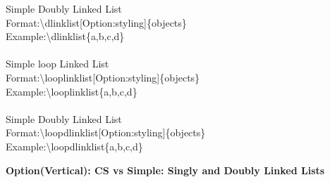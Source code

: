 \documentclass{article}
\begin{document}
Simple Doubly Linked List\\
Format:{\textbackslash}dlinklist[Option:styling]{\{}objects{\}}\\
Example:{\textbackslash}dlinklist{\{}a,b,c,d{\}} \newline \\
\begin{adjustbox}{width=0.5\paperwidth,center,keepaspectratio}
\end{adjustbox}\\
Simple loop Linked List\\
Format:{\textbackslash}looplinklist[Option:styling]{\{}objects{\}}\\
Example:{\textbackslash}looplinklist{\{}a,b,c,d{\}} \newline \\
\begin{adjustbox}{width=0.5\paperwidth,center,keepaspectratio}
\end{adjustbox}\\
Simple Doubly Linked List\\
Format:{\textbackslash}loopdlinklist[Option:styling]{\{}objects{\}}\\
Example:{\textbackslash}loopdlinklist{\{}a,b,c,d{\}} \newline \\
\begin{adjustbox}{width=0.5\paperwidth,center,keepaspectratio}
\end{adjustbox}
\newpage
\begin{center}
\textbf{{\Large Option(Vertical): CS vs Simple: Singly and Doubly Linked Lists}}
\end{center}

\begin{center}
\begin{adjustbox}{height=0.6\paperheight,width=\paperwidth,center,keepaspectratio}
\end{adjustbox}
\end{center}

\end{document}
